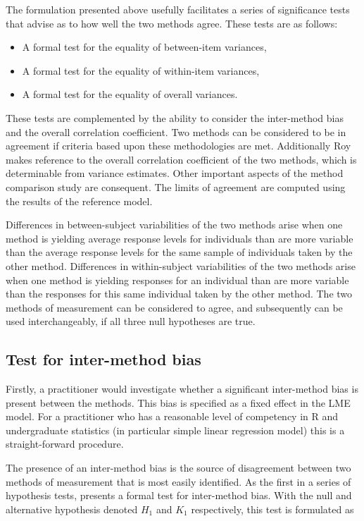 \documentclass[12pt, a4paper]{report}
\theoremstyle{plain}
\theoremstyle{definition}
\theoremstyle{remark}
\begin{document}
	The formulation presented above usefully facilitates a series of
	significance tests that advise as to how well the two methods
	agree. These tests are as follows:
	\begin{itemize}
		\item A formal test for the equality of between-item variances,
		\item A formal test for the equality of within-item variances,
		\item A formal test for the equality of overall variances.
	\end{itemize}
	These tests are complemented by the ability to consider the inter-method bias and the overall correlation coefficient. Two methods can be considered to be in agreement if criteria based upon these methodologies are met. Additionally Roy makes reference to the overall correlation coefficient of the two methods, which is determinable from variance estimates. Other important aspects of the method comparison study are consequent. The limits of agreement are computed using the results of the reference model.
	
	Differences in between-subject variabilities of the two methods arise when one method is yielding average response levels for individuals than are more variable than the average response levels for the same sample of individuals taken by the other method.  Differences in within-subject variabilities of the two methods arise when one method is yielding responses for an individual than are more variable than the responses for this same individual taken by the other method. The two methods of measurement can be considered to agree, and subsequently can be used interchangeably, if all three null hypotheses are true.	
	
	
	
	\subsection{Test for inter-method bias}
	
	Firstly, a practitioner would investigate whether a significant inter-method bias is present between the methods. This bias is specified as a fixed effect in the LME model.  For a practitioner who has a reasonable level of competency in R and undergraduate statistics (in particular simple linear regression model) this is a straight-forward procedure.
	
	The presence of an inter-method bias is the source of disagreement between two methods of measurement that is most easily identified. As the first in a series of hypothesis tests, \citet{ARoy2009} presents a formal test for inter-method bias. With the null and alternative hypothesis denoted $H_1$ and $K_1$ respectively, this test is formulated as
	
\end{document}
